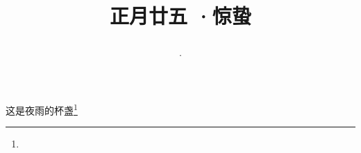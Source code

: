 \title{\date[d=5,m=3,y=2024][year:cn-y,年,month:cn,day:cn,日,·,weekday]·正月廿五 ·惊蛰}
这是夜雨的杯盏\footnote{ }

